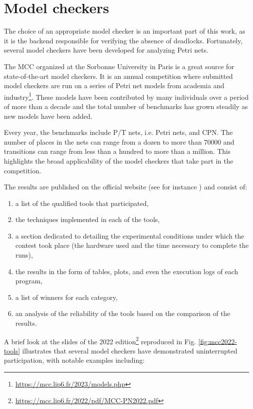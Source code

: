 \section{Model checkers}

The choice of an appropriate model checker is an important part of this work,
as it is the backend responsible for verifying the absence of deadlocks.
Fortunately, several model checkers have been developed for analyzing Petri nets.

The \acrfull{MCC} \cite{khhjp2021} organized at the Sorbonne University in Paris
is a great source for state-of-the-art model checkers.
It is an annual competition where submitted model checkers are run on a series of
Petri net models from academia and industry\footnote{\url{https://mcc.lip6.fr/2023/models.php}}.
These models have been contributed by many individuals over a period of more than a decade
and the total number of benchmarks has grown steadily as new models have been added.

Every year, the benchmarks include \acrfull{P/T nets}, i.e. Petri nets, and \acrfull{CPN}.
The number of places in the nets can range from a dozen to more than 70000 and transitions
can range from less than a hundred to more than a million.
This highlights the broad applicability of the model checkers that take part in the competition.

The results are published on the official website (see for instance \cite{mcc:2022}) and consist of:

\begin{enumerate}
  \item a list of the qualified tools that participated,
  \item the techniques implemented in each of the tools,
  \item a section dedicated to detailing the experimental conditions under which the contest took place
        (the hardware used and the time necessary to complete the runs),
  \item the results in the form of tables, plots, and even the execution logs of each program,
  \item a list of winners for each category,
  \item an analysis of the reliability of the tools based on the comparison of the results.
\end{enumerate}

A brief look at the slides of the 2022 edition\footnote{\url{https://mcc.lip6.fr/2022/pdf/MCC-PN2022.pdf}}
reproduced in Fig. \ref{fig:mcc2022-tools} illustrates
that several model checkers have demonstrated uninterrupted participation,
with notable examples including:


